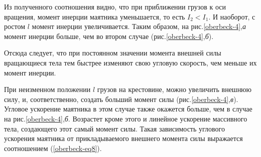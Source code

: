 \documentclass[14pt,a4paper,oneside]{extarticle}	%
\begin{document}
    Из полученного соотношения видно, что при приближении грузов к оси вращения, момент инерции маятника уменьшается, то есть $ I_2<I_1 $.
    И наоборот, с ростом $ l $ момент инерции увеличивается.
    Таким образом, на рис.\ref{oberbeck-4},\textit{а} момент инерции больше, чем во втором случае (рис.\ref{oberbeck-4},\textit{б}).
    
    Отсюда следует, что при постоянном значении момента внешней силы вращающиеся тела тем быстрее изменяют свою угловую скорость, чем меньше их момент инерции.
		
 При неизменном положении $ l $ грузов на крестовине, можно увеличить внешнюю силу, и, соответственно, создать больший момент силы (рис.\ref{oberbeck-4},\textit{в}). 
	Угловое ускорение маятника в этом случае также окажется больше, чем в случае на рис.\ref{oberbeck-4},\textit{б}.
	Возрастет кроме этого и линейное ускорение массивного тела, создающего этот самый момент силы.
	Такая зависимость углового ускорения маятника от прикладываемого внешнего момента силы выражается соотношением (\ref{oberbeck-eq8}).  
\end{document}
